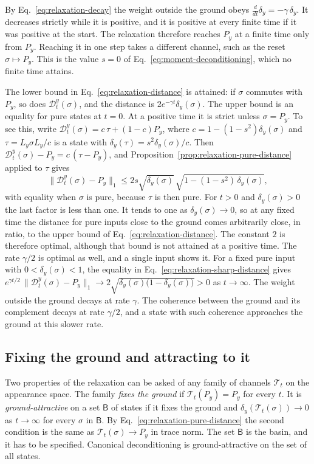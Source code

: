By Eq.~\eqref{eq:relaxation-decay} the weight outside the ground obeys $\tfrac{d}{dt}\delta_y=-\gamma\,\delta_y$. It decreases strictly while it is positive, and it is positive at every finite time if it was positive at the start. The relaxation therefore reaches $P_y$ at a finite time only from $P_y$. Reaching it in one step takes a different channel, such as the reset $\sigma\mapsto P_y$. This is the value $s=0$ of Eq.~\eqref{eq:moment-deconditioning}, which no finite time attains.

The lower bound in Eq.~\eqref{eq:relaxation-distance} is attained: if $\sigma$ commutes with $P_y$, so does $\mathcal D_t^y(\sigma)$, and the distance is $2e^{-\gamma t}\delta_y(\sigma)$. The upper bound is an equality for pure states at $t=0$. At a positive time it is strict unless $\sigma=P_y$. To see this, write $\mathcal D_t^y(\sigma)=c\,\tau+(1-c)P_y$, where $c=1-(1-s^2)\delta_y(\sigma)$ and $\tau=L_y\sigma L_y/c$ is a state with $\delta_y(\tau)=s^2\delta_y(\sigma)/c$. Then $\mathcal D_t^y(\sigma)-P_y=c\,(\tau-P_y)$, and Proposition~\ref{prop:relaxation-pure-distance} applied to $\tau$ gives
\begin{equation}
 \bigl\|\mathcal D_t^y(\sigma)-P_y\bigr\|_1
 \le2s\sqrt{\delta_y(\sigma)}\,\sqrt{1-(1-s^2)\,\delta_y(\sigma)},
 \label{eq:relaxation-sharp-distance}
\end{equation}
with equality when $\sigma$ is pure, because $\tau$ is then pure. For $t>0$ and $\delta_y(\sigma)>0$ the last factor is less than one. It tends to one as $\delta_y(\sigma)\to0$, so at any fixed time the distance for pure inputs close to the ground comes arbitrarily close, in ratio, to the upper bound of Eq.~\eqref{eq:relaxation-distance}. The constant $2$ is therefore optimal, although that bound is not attained at a positive time. The rate $\gamma/2$ is optimal as well, and a single input shows it. For a fixed pure input with $0<\delta_y(\sigma)<1$, the equality in Eq.~\eqref{eq:relaxation-sharp-distance} gives $e^{\gamma t/2}\,\|\mathcal D_t^y(\sigma)-P_y\|_1\to2\sqrt{\delta_y(\sigma)\bigl(1-\delta_y(\sigma)\bigr)}>0$ as $t\to\infty$. The weight outside the ground decays at rate $\gamma$. The coherence between the ground and its complement decays at rate $\gamma/2$, and a state with such coherence approaches the ground at this slower rate.

\subsection{Fixing the ground and attracting to it}
\label{subsec:relaxation-unitary}
Two properties of the relaxation can be asked of any family of channels $\mathcal T_t$ on the appearance space. The family \emph{fixes the ground} if $\mathcal T_t(P_y)=P_y$ for every $t$. It is \emph{ground-attractive} on a set $\mathsf B$ of states if it fixes the ground and $\delta_y(\mathcal T_t(\sigma))\to0$ as $t\to\infty$ for every $\sigma$ in $\mathsf B$. By Eq.~\eqref{eq:relaxation-pure-distance} the second condition is the same as $\mathcal T_t(\sigma)\to P_y$ in trace norm. The set $\mathsf B$ is the basin, and it has to be specified. Canonical deconditioning is ground-attractive on the set of all states.

